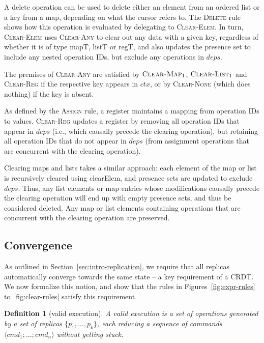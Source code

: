 \documentclass[10pt,journal,compsoc]{IEEEtran}
\newtheorem{definition}{Definition}
\begin{document}
A \textsf{delete} operation can be used to delete either an element from an ordered list or a key from a map, depending on what the cursor refers to. The \textsc{Delete} rule shows how this operation is evaluated by delegating to \textsc{Clear-Elem}. In turn, \textsc{Clear-Elem} uses \textsc{Clear-Any} to clear out any data with a given key, regardless of whether it is of type \textsf{mapT}, \textsf{listT} or \textsf{regT}, and also updates the presence set to include any nested operation IDs, but exclude any operations in $\mathit{deps}$.

The premises of \textsc{Clear-Any} are satisfied by $\textsc{Clear-Map}_1$, $\textsc{Clear-List}_1$ and \textsc{Clear-Reg} if the respective key appears in $\mathit{ctx}$, or by \textsc{Clear-None} (which does nothing) if the key is absent.

As defined by the \textsc{Assign} rule, a register maintains a mapping from operation IDs to values. \textsc{Clear-Reg} updates a register by removing all operation IDs that appear in $\mathit{deps}$ (i.e., which causally precede the clearing operation), but retaining all operation IDs that do not appear in $\mathit{deps}$ (from assignment operations that are concurrent with the clearing operation).

Clearing maps and lists takes a similar approach: each element of the map or list is recursively cleared using \textsf{clearElem}, and presence sets are updated to exclude $\mathit{deps}$. Thus, any list elements or map entries whose modifications causally precede the clearing operation will end up with empty presence sets, and thus be considered deleted. Any map or list elements containing operations that are concurrent with the clearing operation are preserved.

\subsection{Convergence}\label{sec:convergence}

As outlined in Section~\ref{sec:intro-replication}, we require that all replicas automatically converge towards the same state -- a key requirement of a CRDT. We now formalize this notion, and show that the rules in Figures~\ref{fig:expr-rules} to~\ref{fig:clear-rules} satisfy this requirement.

\begin{definition}[valid execution]\label{def:valid-exec}
A \emph{valid execution} is a set of operations generated by a set of replicas $\{p_1, \dots, p_k\}$, each reducing a sequence of commands $\langle \mathit{cmd}_1 \mathbin{;} \dots \mathbin{;} \mathit{cmd}_n \rangle$ without getting stuck.
\end{definition}
\end{document}

